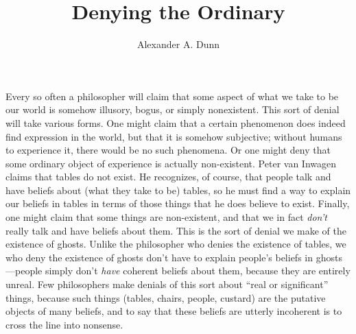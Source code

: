 \documentclass[11pt]{article}
\title{Denying the Ordinary}
\author{Alexander A. Dunn}
\newenvironment{squote}{\begin{quote}\begin{singlespace}}{\end{singlespace}\end{quote}}
\newenvironment{inq}{%
	\begin{center}
	\begin{spacing}{1}
	\list{}{%
	\leftmargin0.75in   %
    \rightmargin\leftmargin
	\item\relax}
	}{%
	\endlist
	\end{spacing}
	\end{center}
	}
\begin{document}
\ifstandalone
\maketitle
\begin{spacing}{1.5}
\fi



Every so often a philosopher will claim that some aspect of what we take to be our world is somehow illusory, bogus, or simply nonexistent. This sort of denial will take various forms. One might claim that a certain phenomenon does indeed find expression in the world, but that it is somehow subjective; without humans to experience it, there would be no such phenomena. Or one might deny that some ordinary object of experience is actually non-existent. Peter van Inwagen claims that tables do not exist. He recognizes, of course, that people talk and have beliefs about (what they take to be) tables, so he must find a way to explain our beliefs in tables in terms of those things that he does believe to exist. Finally, one might claim that some things are non-existent, and that we in fact {\em don't} really talk and have beliefs about them. This is the sort of denial we make of the existence of ghosts. Unlike the philosopher who denies the existence of tables, we who deny the existence of ghosts don't have to explain people's beliefs in ghosts---people simply don't {\em have} coherent beliefs about them, because they are entirely unreal. Few philosophers make denials of this sort about ``real or significant'' things, because such things (tables, chairs, people, custard) are the putative objects of many beliefs, and to say that these beliefs are utterly incoherent is to cross the line into nonsense.%


\end{spacing}
\end{document}
